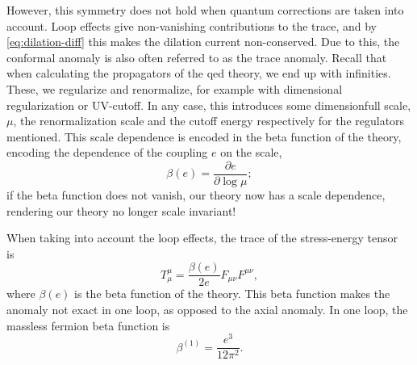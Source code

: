 However, this symmetry does not hold when quantum corrections are taken into account.
Loop effects give non-vanishing contributions to the trace, and by \cref{eq:dilation-diff} this makes the dilation current non-conserved.
Due to this, the conformal anomaly is also often referred to as the trace anomaly.
Recall that when calculating the propagators of the \gls{qed} theory, we end up with infinities.
These, we regularize and renormalize, for example with dimensional regularization or UV-cutoff.
In any case, this introduces some dimensionfull scale, $\mu $, the renormalization scale and the cutoff energy respectively for the regulators mentioned.
This scale dependence is encoded in the beta function of the theory, encoding the dependence of the coupling $e$ on the scale,
\begin{equation}
  \beta (e) = \frac{\partial e}{\partial \log \mu };
\end{equation}
if the beta function does not vanish, our theory now has a scale dependence, rendering our theory no longer scale invariant!


When taking into account the loop effects, the trace of the stress-energy tensor is~\cite{kachelriessQuantumFieldsHubble2018}
\begin{equation}
  T_{\mu }^{\mu } = \frac{\beta (e)}{2 e} F_{\mu \nu }F^{\mu \nu },
\end{equation}
where $\beta (e)$ is the beta function of the theory.
This beta function makes the anomaly not exact in one loop, as opposed to the axial anomaly.
In one loop, the massless fermion beta function is~\cite{chernodubAnomalousTransportDue2016}
\begin{equation}
  \label{eq:beta-function}
  \beta ^{(1)} = \frac{e^3}{12 \pi^2}.
\end{equation}

